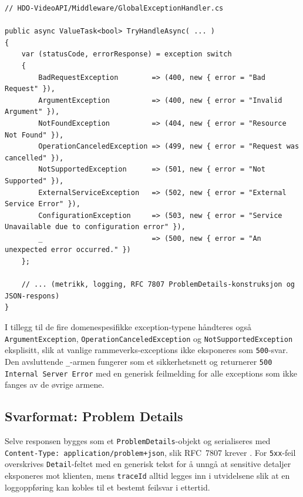 \begin{lstlisting}[language={[Sharp]C}, caption={Tilordning fra exception-type til HTTP-statuskode i \texttt{GlobalExceptionHandler}}, label={lst:mapping}]
// HDO-VideoAPI/Middleware/GlobalExceptionHandler.cs

public async ValueTask<bool> TryHandleAsync( ... )
{
    var (statusCode, errorResponse) = exception switch
    {
        BadRequestException        => (400, new { error = "Bad Request" }),
        ArgumentException          => (400, new { error = "Invalid Argument" }),
        NotFoundException          => (404, new { error = "Resource Not Found" }),
        OperationCanceledException => (499, new { error = "Request was cancelled" }),
        NotSupportedException      => (501, new { error = "Not Supported" }),
        ExternalServiceException   => (502, new { error = "External Service Error" }),
        ConfigurationException     => (503, new { error = "Service Unavailable due to configuration error" }),
        _                          => (500, new { error = "An unexpected error occurred." })
    };

    // ... (metrikk, logging, RFC 7807 ProblemDetails-konstruksjon og JSON-respons)
}
\end{lstlisting}

I tillegg til de fire domenespesifikke exception-typene håndteres også \texttt{ArgumentException}, \texttt{OperationCanceledException} og \texttt{NotSupportedException} eksplisitt, slik at vanlige rammeverks-exceptions ikke eksponeres som \texttt{500}-svar. Den avsluttende \texttt{\_}-armen fungerer som et sikkerhetsnett og returnerer \texttt{500 Internal Server Error} med en generisk feilmelding for alle exceptions som ikke fanges av de øvrige armene.

\subsection{Svarformat: Problem Details}
\label{subsec:errors-problemdetails}

Selve responsen bygges som et \texttt{ProblemDetails}-objekt og serialiseres med \texttt{Content-Type: application/problem+json}, slik RFC~7807 krever \cite{rfc7807}. For \texttt{5xx}-feil overskrives \texttt{Detail}-feltet med en generisk tekst for å unngå at sensitive detaljer eksponeres mot klienten, mens \texttt{traceId} alltid legges inn i utvidelsene slik at en loggoppføring kan kobles til et bestemt feilsvar i ettertid.

